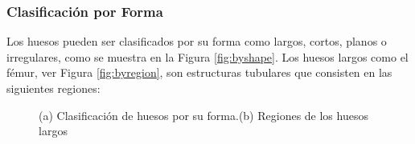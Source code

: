 \subsubsection*{Clasificaci\'on por Forma}

Los huesos pueden ser clasificados por su forma como largos, cortos, planos o irregulares, como se muestra en la Figura \ref{fig:byshape}. Los huesos largos como el f\'emur, ver Figura \ref{fig:byregion}, son estructuras tubulares que consisten en las siguientes regiones:

\begin{figure}[htb]
  \begin{center}
  \hspace{1cm}
  \end{center}
  \caption{(a) Clasificaci\'on de huesos por su forma.(b) Regiones de los huesos largos}
  \label{fig:second}
\end{figure}

